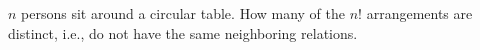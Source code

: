 $n$ persons sit around a circular table. How many of the $n!$ arrangements are distinct, i.e., do not have the same neighboring relations.
